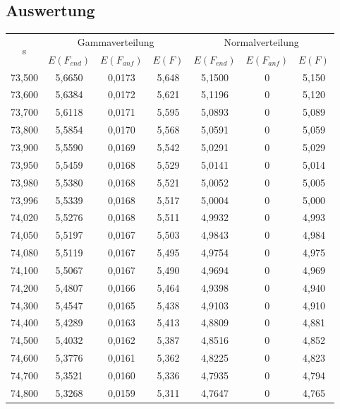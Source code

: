 \subsection{Auswertung}
\begin{table}[!h]
	\centering
	\begin{tabular}{|c||c|c|c||c|c|c|}
		\hline
		\multirow{2}{*}{s} & \multicolumn{3}{c||}{Gammaverteilung} & \multicolumn{3}{c|}{Normalverteilung}\\
		\cline{2-7}
		 & \(E\left(F_{end}\right)\) & \(E\left(F_{anf}\right)\) & \(E\left(F\right)\) & \(E\left(F_{end}\right)\) & \(E\left(F_{anf}\right)\) & \(E\left(F\right)\)  \\
		\hline
		73,500 & 5,6650 & 0,0173 & 5,648 & 5,1500 & 0 & 5,150 \\
		73,600 & 5,6384 & 0,0172 & 5,621 & 5,1196 & 0 & 5,120 \\
		73,700 & 5,6118 & 0,0171 & 5,595 & 5,0893 & 0 & 5,089 \\
		73,800 & 5,5854 & 0,0170 & 5,568 & 5,0591 & 0 & 5,059 \\
		73,900 & 5,5590 & 0,0169 & 5,542 & 5,0291 & 0 & 5,029 \\
		73,950 & 5,5459 & 0,0168 & 5,529 & 5,0141 & 0 & 5,014 \\
		73,980 & 5,5380 & 0,0168 & 5,521 & 5,0052 & 0 & 5,005 \\
		\hline
		73,996 & 5,5339 & 0,0168 & 5,517 & 5,0004 & 0 & \cellcolor[gray]{0.8} 5,000 \\
		\hline
		74,020 & 5,5276 & 0,0168 & 5,511 & 4,9932 & 0 & 4,993 \\
		74,050 & 5,5197 & 0,0167 & 5,503 & 4,9843 & 0 & 4,984 \\
		74,080 & 5,5119 & 0,0167 & 5,495 & 4,9754 & 0 & 4,975 \\
		74,100 & 5,5067 & 0,0167 & 5,490 & 4,9694 & 0 & 4,969 \\
		74,200 & 5,4807 & 0,0166 & 5,464 & 4,9398 & 0 & 4,940 \\
		74,300 & 5,4547 & 0,0165 & 5,438 & 4,9103 & 0 & 4,910 \\
		74,400 & 5,4289 & 0,0163 & 5,413 & 4,8809 & 0 & 4,881 \\
		74,500 & 5,4032 & 0,0162 & 5,387 & 4,8516 & 0 & 4,852 \\
		74,600 & 5,3776 & 0,0161 & 5,362 & 4,8225 & 0 & 4,823 \\
		74,700 & 5,3521 & 0,0160 & 5,336 & 4,7935 & 0 & 4,794 \\
		74,800 & 5,3268 & 0,0159 & 5,311 & 4,7647 & 0 & 4,765 \\

\end{tabular}
\end{table}
